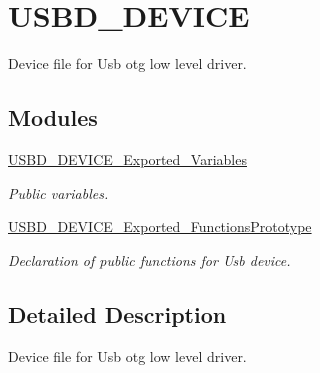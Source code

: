 \hypertarget{group__USBD__DEVICE}{}\section{U\+S\+B\+D\+\_\+\+D\+E\+V\+I\+CE}
\label{group__USBD__DEVICE}


Device file for Usb otg low level driver.  


\subsection*{Modules}
\begin{DoxyCompactItemize}
\item 
\hyperlink{group__USBD__DEVICE__Exported__Variables}{U\+S\+B\+D\+\_\+\+D\+E\+V\+I\+C\+E\+\_\+\+Exported\+\_\+\+Variables}
\begin{DoxyCompactList}\small\item\em Public variables. \end{DoxyCompactList}\item 
\hyperlink{group__USBD__DEVICE__Exported__FunctionsPrototype}{U\+S\+B\+D\+\_\+\+D\+E\+V\+I\+C\+E\+\_\+\+Exported\+\_\+\+Functions\+Prototype}
\begin{DoxyCompactList}\small\item\em Declaration of public functions for Usb device. \end{DoxyCompactList}\end{DoxyCompactItemize}


\subsection{Detailed Description}
Device file for Usb otg low level driver. 

